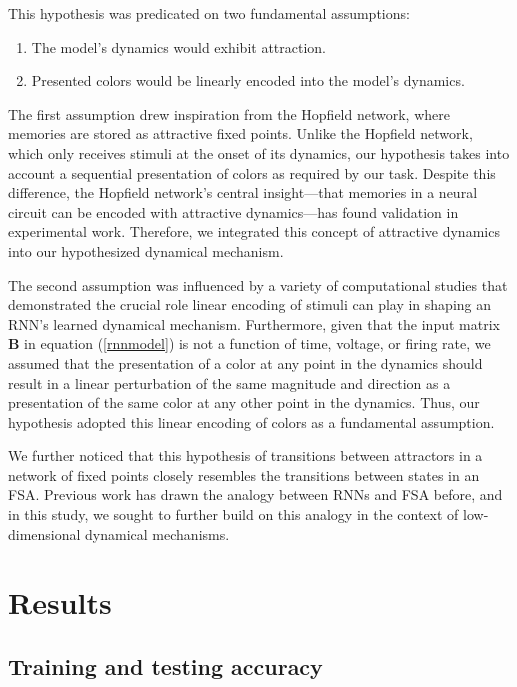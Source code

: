 \documentclass[conference]{IEEEtran}
\begin{document}
This hypothesis was predicated on two fundamental assumptions:
\begin{enumerate}
\item The model's dynamics would exhibit attraction.
\item Presented colors would be linearly encoded into the model's dynamics.
\end{enumerate}
The first assumption drew inspiration from the Hopfield network\cite{hopfield1982neural}, where memories are stored as attractive fixed points. Unlike the Hopfield network, which only receives stimuli at the onset of its dynamics, our hypothesis takes into account a sequential presentation of colors as required by our task. Despite this difference, the Hopfield network's central insight---that memories in a neural circuit can be encoded with attractive dynamics---has found validation in experimental work\cite{chaisangmongkon2017computing,khona2022attractor}. Therefore, we integrated this concept of attractive dynamics into our hypothesized dynamical mechanism.

The second assumption was influenced by a variety of computational studies that demonstrated the crucial role linear encoding of stimuli can play in shaping an RNN's learned dynamical mechanism\cite{sussillo2013opening,mante2013context,driscoll2022flexible,kay2022neural}. Furthermore, given that the input matrix $\textbf{B}$ in equation (\ref{rnnmodel}) is not a function of time, voltage, or firing rate, we assumed that the presentation of a color at any point in the dynamics should result in a linear perturbation of the same magnitude and direction as a presentation of the same color at any other point in the dynamics. Thus, our hypothesis adopted this linear encoding of colors as a fundamental assumption.

We further noticed that this hypothesis of transitions between attractors in a network of fixed points closely resembles the transitions between states in an FSA. Previous work has drawn the analogy between RNNs and FSA before\cite{cleeremans1989finite}, and in this study, we sought to further build on this analogy in the context of low-dimensional dynamical mechanisms.

\section{Results}

\subsection{Training and testing accuracy}
\end{document}
